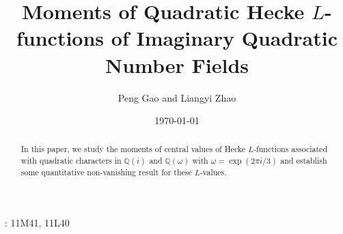 \documentclass[twoside,leqno,10pt, A4]{amsart}
\begin{document}
\newtheorem{theorem}[subsection]{Theorem}
\newtheorem{proposition}[subsection]{Proposition}
\newtheorem{lemma}[subsection]{Lemma}
\newtheorem{corollary}[subsection]{Corollary}
\newtheorem{conjecture}[subsection]{Conjecture}
\newtheorem{prop}[subsection]{Proposition}
\newcommand{\mr}{\ensuremath{\mathbb R}}
\newcommand{\mc}{\ensuremath{\mathbb C}}
\newcommand{\dif}{\mathrm{d}}
\newcommand{\intz}{\mathbb{Z}}
\newcommand{\ratq}{\mathbb{Q}}
\newcommand{\natn}{\mathbb{N}}
\newcommand{\comc}{\mathbb{C}}
\newcommand{\rear}{\mathbb{R}}
\newcommand{\prip}{\mathbb{P}}
\newcommand{\uph}{\mathbb{H}}
\newcommand{\fief}{\mathbb{F}}
\newcommand{\majorarc}{\mathfrak{M}}
\newcommand{\minorarc}{\mathfrak{m}}
\newcommand{\sings}{\mathfrak{S}}
\newcommand{\fA}{\ensuremath{\mathfrak A}}
\newcommand{\mn}{\ensuremath{\mathbb N}}
\newcommand{\mq}{\ensuremath{\mathbb Q}}
\newcommand{\half}{\tfrac{1}{2}}
\newcommand{\f}{f\times \chi}
\newcommand{\summ}{\mathop{{\sum}^{\star}}}
\newcommand{\chiq}{\chi \bmod q}
\newcommand{\chidb}{\chi \bmod db}
\newcommand{\chid}{\chi \bmod d}
\newcommand{\sym}{\text{sym}^2}
\newcommand{\hhalf}{\tfrac{1}{2}}
\newcommand{\sumstar}{\sideset{}{^*}\sum}
\newcommand{\sumprime}{\sideset{}{'}\sum}
\newcommand{\sumprimeprime}{\sideset{}{''}\sum}
\newcommand{\shortmod}{\ensuremath{\negthickspace \negthickspace \negthickspace \pmod}}
\newcommand{\V}{V\left(\frac{nm}{q^2}\right)}
\newcommand{\sumi}{\mathop{{\sum}^{\dagger}}}
\newcommand{\mz}{\ensuremath{\mathbb Z}}
\newcommand{\leg}[2]{\left(\frac{#1}{#2}\right)}
\newcommand{\muK}{\mu_{\omega}}

\title[Moments {H}ecke {$L$}-functions with quadratic characters]{Moments of Quadratic {H}ecke {$L$}-functions of Imaginary Quadratic Number Fields}

\date{\today}
\author{Peng Gao and Liangyi Zhao}

\begin{abstract}
In this paper, we study the moments of central values of Hecke $L$-functions associated with quadratic characters in $\mq(i)$ and $\mq(\omega)$ with $\omega=\exp(2\pi i/3)$ and establish some quantitative non-vanishing result for these $L$-values.
\end{abstract}

\maketitle

: 11M41, 11L40  \newline
\end{document}

